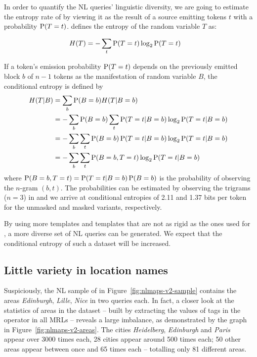 In order to quantify the NL queries’ linguistic diversity, we are going to
estimate the entropy rate of \nlmapstwo{} by viewing it as the result of a
source emitting tokens \(t\) with a probability \(\operatorname*{P}(T=t)\).
\textcite{shannon-1948} defines the entropy of the random variable \(T\) as:

\begin{align}
  H(T) &= - \sum_t \operatorname*{P}(T=t) \log_2 \operatorname*{P}(T=t)
\end{align}

If a token’s emission probability \(\operatorname*{P}(T=t)\) depends on the previously emitted
block \(b\) of \(n-1\) tokens as the manifestation of random variable \(B\), the
conditional entropy is defined by
\begin{align}
  H(T|B) &= \sum_b \operatorname*{P}(B=b) H(T|B=b)\\
         &= - \sum_b \operatorname*{P}(B=b) \sum_t \operatorname*{P}(T=t|B=b) \log_2 \operatorname*{P}(T=t|B=b)\\
         &= - \sum_b \sum_t \operatorname*{P}(B=b) \operatorname*{P}(T=t|B=b) \log_2 \operatorname*{P}(T=t|B=b)\\
         &= - \sum_b \sum_t \operatorname*{P}(B=b, T=t) \log_2 \operatorname*{P}(T=t|B=b)
\end{align}
where \(\operatorname*{P}(B=b, T=t) = \operatorname*{P}(T=t|B=b) \operatorname*{P}(B=b)\) is the probability of observing the
\(n\)-gram \((b, t)\). The probabilities can be estimated by observing the
trigrams (\(n=3\)) in \nlmapstwo{} and we arrive at conditional entropies of
\num{2.11} and \num{1.37} bits per token for the unmasked and masked variants,
respectively.

By using more templates and templates that are not as rigid as the ones used for
\nlmapstwo{}, a more diverse set of NL queries can be generated. We expect that
the conditional entropy of such a dataset will be increased.

\subsection{Little variety in location names}
\label{sec:little-location-variety}

Suspiciously, the NL sample of \nlmapstwo{} in Figure~\ref{fig:nlmaps-v2-sample}
contains the areas \emph{Edinburgh}, \emph{Lille}, \emph{Nice} in two queries
each. In fact, a closer look at the statistics of areas in the dataset – built
by extracting the values of  tags in the  operator in
all \nlmapstwo{} MRLs – reveals a large imbalance, as demonstrated by the graph
in Figure~\ref{fig:nlmaps-v2-areas}. The cities \emph{Heidelberg},
\emph{Edinburgh} and \emph{Paris} appear over \num{3000} times each, \num{28}
cities appear around \num{500} times each; \num{50} other areas appear between
once and \num{65} times each – totalling only \num{81} different areas.

